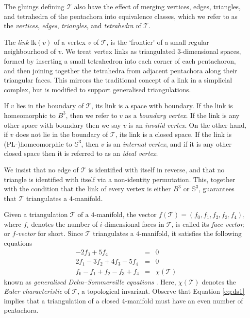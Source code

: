 \documentclass[pdflatex,sn-mathphys-num]{sn-jnl}
\theoremstyle{thmstyleone}%
\theoremstyle{thmstyletwo}%
\theoremstyle{thmstylethree}%
\newcommand{\tri}{\mathcal{T}}
\newcommand{\lk}{\mathrm{lk}}
\theoremstyle{remark}
\begin{document}
The gluings defining $\tri$ also have the effect of merging vertices, edges, triangles, and tetrahedra of the pentachora into equivalence classes, which we refer to as the \emph{vertices}, \emph{edges}, \emph{triangles}, and \emph{tetrahedra} of $\tri$.	

The \emph{link} $\lk(v)$ of a vertex $v$ of $\tri$, is the `frontier' of a small regular neighbourhood of $v$. We treat vertex links as triangulated $3$-dimensional spaces, formed by inserting a small tetrahedron into each corner of each pentachoron, and then joining together the tetrahedra from adjacent pentachora along their triangular faces. This mirrors the traditional concept of a link in a simplicial complex, but is modified to support generalised triangulations.

If $v$ lies in the boundary of $\tri$, its link is a space with boundary. If the link is homeomorphic to $B^3$, then we refer to $v$ as a \emph{boundary vertex}. If the link is any other space with boundary then we say $v$ is an \emph{invalid vertex}. On the other hand, if $v$ does not lie in the boundary of $\tri$, its link is a closed space. If the link is (PL-)homeomorphic to $\mathbb{S}^3$, then $v$ is an \emph{internal vertex}, and if it is any other closed space then it is referred to as an \emph{ideal vertex}.

We insist that no edge of $\tri$ is identified with itself in reverse, and that no triangle is identified with itself via a non-identity permutation. This, together with the condition that the link of every vertex is either $B^3$ or $\mathbb{S}^3$, guarantees that $\tri$ triangulates a $4$-manifold.

Given a triangulation $\tri$ of a $4$-manifold, the vector $f(\tri) = (f_0, f_1, f_2, f_3, f_4)$, where $f_i$ denotes the number of $i$-dimensional faces in $\tri$, is called its {\em face vector}, or {\em $f$-vector} for short. Since $\tri$ triangulates a $4$-manifold, it satisfies the following equations
\begin{eqnarray}
    -2f_3+5f_4 &=& 0 \label{eq:ds1}\\
    2f_1 - 3f_2 + 4f_3 - 5f_4 &=& 0 \label{eq:ds2}\\
    f_0 - f_1 + f_2 - f_3 + f_4 &=& \chi(\tri) \label{eq:ds3}
\end{eqnarray}
known as {\em generalised Dehn--Sommerville equations} \cite{dehnSommervilleEqns}. Here, $\chi(\tri)$ denotes the {\em Euler characteristic} of $\tri$, a topological invariant. Observe that Equation \eqref{eq:ds1} implies that a triangulation of a closed $4$-manifold must have an even number of pentachora.
\end{document}
